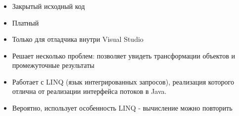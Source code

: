 \begin{frame}
\frametitle{\insertsection} 
\framesubtitle{\insertsubsection}
\begin{itemize}
	\item Закрытый исходный код
	\item Платный
	\item Только для отладчика внутри Visual Studio
	\item Решает несколько проблем: позволяет увидеть трансформации объектов и промежуточные результаты
	\item Работает с LINQ (язык интегрированных запросов), реализация которого отлична от реализации интерфейса потоков в Java.
	\item Вероятно, использует особенность LINQ - вычисление можно повторить
	
	\inputminted{csharp}{code/repeat.cs}
\end{itemize}
\end{frame}
